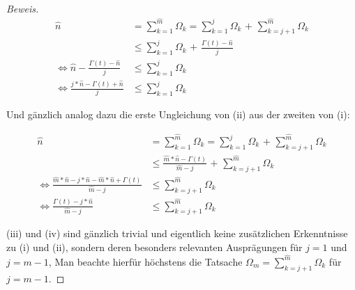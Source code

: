 \begin{proof}[Beweis]
\begin{align*}
\widehat{n} &= \sum_{k=1}^{\widehat{m}} \Omega_k = \sum_{k=1}^{j} \Omega_k \textrm{  +  } \sum_{k=j+1}^{\widehat{m}} \Omega_k \\
&\leq \sum_{k=1}^{j} \Omega_k \textrm{  +  } \frac{\Gamma(t) - \widehat{n}}{j} \\
\Leftrightarrow \widehat{n} - \frac{\Gamma(t) - \widehat{n}}{j} &\leq \sum_{k=1}^{j} \Omega_k \\
\Leftrightarrow \frac{j * \widehat{n} - \Gamma(t) + \widehat{n}}{j} &\leq \sum_{k=1}^{j} \Omega_k
\end{align*}

\vspace{0.3cm}

Und gänzlich analog dazu die erste Ungleichung von (ii) aus der zweiten von (i):

\begin{align*}
\widehat{n} &= \sum_{k=1}^{\widehat{m}} \Omega_k = \sum_{k=1}^{j} \Omega_k \textrm{  +  } \sum_{k=j+1}^{\widehat{m}} \Omega_k \\
&\leq \frac{\widehat{m} * \widehat{n} - \Gamma(t)}{\widehat{m} - j} \textrm{  +  } \sum_{k=j+1}^{\widehat{m}} \Omega_k \\
\Leftrightarrow \frac{\widehat{m} * \widehat{n} - j * \widehat{n} - \widehat{m} * \widehat{n} + \Gamma(t)}{\widehat{m} - j} &\leq \sum_{k=j+1}^{\widehat{m}} \Omega_k \\
\Leftrightarrow \frac{\Gamma(t) - j * \widehat{n}}{\widehat{m} - j} &\leq \sum_{k=j+1}^{\widehat{m}} \Omega_k
\end{align*}

\vspace{0.3cm}


(iii) und (iv) sind gänzlich trivial und eigentlich keine zusätzlichen Erkenntnisse zu (i) und (ii), sondern deren besonders relevanten Ausprägungen für $j=1$ und $j=m-1$, Man beachte hierfür höchstens die Tatsache $\Omega_m = \sum_{k=j+1}^{\widehat{m}} \Omega_k$ für $j=m-1$.
  
\end{proof}




\vspace{0.6cm}
\todo{[Beispiel]}
\vspace{0.6cm}


